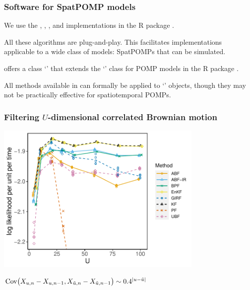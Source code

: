 \documentclass{beamer}
\begin{document}
\begin{frame}
  \frametitle{Software for SpatPOMP models}


  \newcommand\spatpompsep{\vspace{3mm}}
  
  \begin{myitemize}
    
  \item We use the , , ,  and  implementations in the  R package  \citep{asfaw20github}.

    \spatpompsep
    
\item All these algorithms are plug-and-play. This facilitates implementations applicable to a wide class of models: SpatPOMPs that can be simulated.
   
      \spatpompsep

  \item {} offers a class `' that extends the `' class for POMP models in the R package  \citep{king16}.

    \spatpompsep

\item All methods available in  can formally be applied to `' objects, though they may not be practically effective for spatiotemporal POMPs.

    \end{myitemize}
    
\end{frame}

\begin{frame}
\frametitle{Filtering $U$-dimensional correlated Brownian motion}

\vspace{-3mm}

\begin{center}
\includegraphics[width=10cm]{bm_alt_plot-1.pdf}

\vspace{-1mm}

$\mathrm{Cov}\big(X_{u,n}-X_{u,n-1},X_{\tilde u,n}-X_{\tilde u,n-1}\big) \sim 0.4^{|u-\tilde u|}_{}$

\end{center}

\end{frame}
\end{document}
